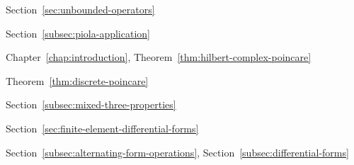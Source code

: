 \par\noindent\hspace*{1em}\label{index:operator-unbounded}\quad Section~\ref{sec:unbounded-operators}

\par\noindent\hspace*{0em}\label{index:piola-transform}\quad Section~\ref{subsec:piola-application}

\par\noindent\hspace*{0em}\label{index:poincar-inequality}\quad Chapter~\ref{chap:introduction}, Theorem~\ref{thm:hilbert-complex-poincare}

\par\noindent\hspace*{1em}\label{index:poincar-inequality-discrete}\quad Theorem~\ref{thm:discrete-poincare}

\par\noindent\hspace*{0em}\label{index:projection}

\par\noindent\hspace*{1em}\label{index:projection-bounded-cochain}\quad Section~\ref{subsec:mixed-three-properties}

\par\noindent\hspace*{1em}\label{index:projection-canonical}\quad Section~\ref{sec:finite-element-differential-forms}

\par\noindent\hspace*{0em}\label{index:proxy}\quad Section~\ref{subsec:alternating-form-operations}, Section~\ref{subsec:differential-forms}

